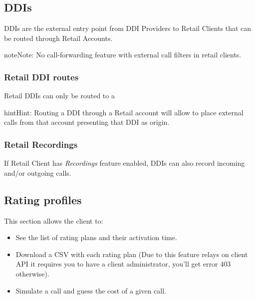 \documentclass[letterpaper,10pt,english]{sphinxmanual}
\begin{document}
\subsection{DDIs}
\label{administration_portal/client/retail/ddis:ddis}\label{administration_portal/client/retail/ddis::doc}\label{administration_portal/client/retail/ddis:retail-ddis}
DDIs are the external entry point from DDI Providers to Retail Clients that
can be routed through Retail Accounts.

\begin{notice}{note}{Note:}
No call-forwarding feature with external call filters in retail clients.
\end{notice}


\subsubsection{Retail DDI routes}
\label{administration_portal/client/retail/ddis:retail-ddi-routes}
Retail DDIs can only be routed to a {\hyperref[administration_portal/client/retail/retail_accounts:retail\string-accounts]{}}

\begin{notice}{hint}{Hint:}
Routing a DDI through a Retail account will allow to place external calls
from that account presenting that DDI as origin.
\end{notice}


\subsubsection{Retail Recordings}
\label{administration_portal/client/retail/ddis:retail-recordings}
If Retail Client has \emph{Recordings} feature enabled, DDIs can also record incoming and/or
outgoing calls.


\subsection{Rating profiles}
\label{administration_portal/client/retail/rating_profiles:rating-profiles}\label{administration_portal/client/retail/rating_profiles::doc}
This section allows the client to:
\begin{itemize}
\item {} 
See the list of rating plans and their activation time.

\item {} 
Download a CSV with each rating plan (Due to this feature relays on client API it requires you to have a client administrator, you'll get error 403 otherwise).

\item {} 
Simulate a call and guess the cost of a given call.

\end{itemize}
\end{document}
